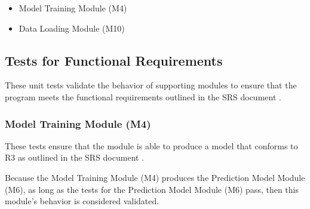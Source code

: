\documentclass[12pt, titlepage]{article}
\begin{document}
\begin{itemize}
  \item Model Training Module (M4)
  \item Data Loading Module (M10)
\end{itemize}


\subsection{Tests for Functional Requirements}

These unit tests validate the behavior of supporting modules to ensure that the
\progname{} program meets the functional requirements outlined in the SRS
document \citep{SRS}.


\subsubsection{Model Training Module (M4)}

These tests ensure that the module is able to produce a model that conforms
to R3 as outlined in the SRS document \citep{SRS}.

Because the Model Training Module (M4) produces the Prediction Model Module (M6),
as long as the tests for the Prediction Model Module (M6) pass, then this
module's behavior is considered validated.

\end{document}
